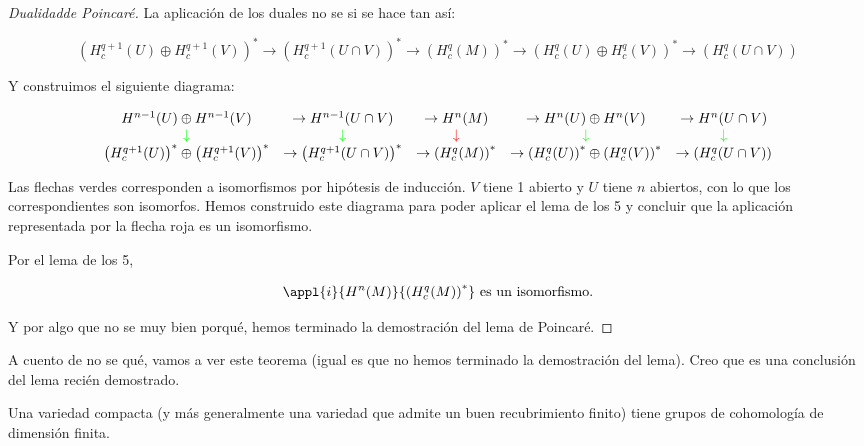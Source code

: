 \documentclass[palatino, bibnumbers]{apuntes}
\begin{document}
\begin{proof}[Dualidad\IS de Poincaré]
La aplicación de los duales no se si se hace tan así:

\begin{equation}
\label{absurdo:2}
\left(H_c^{q+1}(U) \oplus H_c^{q+1}(V) \right)^{\ast}\to\left(H_c^{q+1}(U\cap V) \right)^{\ast}\to\left(H_c^q(M) \right)^{\ast}\to\left(H_c^{q}(U)\oplus H_c^q(V) \right)^{\ast}\to\left(H_c^q(U\cap V)\right)
\end{equation}



Y construimos el siguiente diagrama:

\begin{equation}
\label{absurdo:4}
\begin{array}{ccccc}
H^{n-1}(U) \oplus H^{n-1}(V) 	&	\to H^{n-1}(U\cap V) 	&	\to H^n(M) 	&	\to H^{n}(U)\oplus H^n(V) 	&	\to H^n(U\cap V)\\
\textcolor{green}{\downarrow} & \textcolor{green}{\downarrow} & \textcolor{red}{\downarrow} & \textcolor{green}{\downarrow} & \textcolor{green}{\downarrow} \\
\left(H_c^{q+1}(U)\right)^{\ast} \oplus \left(H_c^{q+1}(V) \right)^{\ast}	&	\to\left(H_c^{q+1}(U\cap V) \right)^{\ast}	&	\to\left(H_c^q(M) \right)^{\ast}	&	\to\left(H_c^{q}(U)\right)^{\ast}\oplus \left(H_c^q(V) \right)^{\ast}	&	\to\left(H_c^q(U\cap V)\right)
\end{array}
\end{equation}

Las flechas verdes corresponden a isomorfismos por hipótesis de inducción. $V$ tiene 1 abierto y $U$ tiene $n$ abiertos, con lo que los correspondientes son isomorfos. Hemos construido este diagrama para poder aplicar el lema de los 5 y concluir que la aplicación representada por la flecha roja es un isomorfismo.

Por el lema de los 5, 

\[
\appl{i}{H^n(M)}{\left(H_c^q(M)\right)^{\ast}} \text{ es un isomorfismo.}
\]

Y por algo que no se muy bien porqué, hemos terminado la demostración del lema de Poincaré.

\end{proof}

A cuento de no se qué, vamos a ver este teorema (igual es que no hemos terminado la demostración del lema). Creo que es una conclusión del lema recién demostrado.

\begin{theorem}
Una variedad compacta (y más generalmente una variedad que admite un buen recubrimiento finito) tiene grupos de cohomología de dimensión finita.
\end{theorem}
\end{document}
